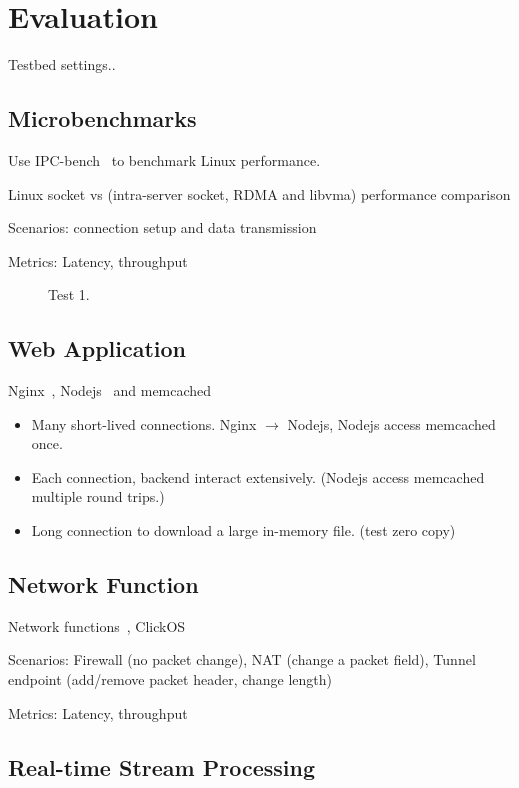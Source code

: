 \section{Evaluation}
\label{sec:evaluation}

Testbed settings..

\subsection{Microbenchmarks}

Use IPC-bench~\cite{ipc-bench} to benchmark Linux performance.

Linux socket vs \sys (intra-server socket, RDMA and libvma) performance comparison

Scenarios: connection setup and data transmission

Metrics: Latency, throughput
\begin{figure}[t]
	\centering
	
	\caption{Test 1.}
	\label{fig:eval-messagesize}
\end{figure}
\subsection{Web Application}

Nginx~\cite{nginx}, Nodejs~\cite{nodejs} and memcached~\cite{memcached}

\begin{itemize}
	\item Many short-lived connections. Nginx $\rightarrow$ Nodejs, Nodejs access memcached once.
	\item Each connection, backend interact extensively. (Nodejs access memcached multiple round trips.)
	\item Long connection to download a large in-memory file. (test zero copy)
\end{itemize}

\subsection{Network Function}

Network functions~\cite{li2016clicknp}, ClickOS~\cite{martins2014clickos}

Scenarios: Firewall (no packet change), NAT (change a packet field), Tunnel endpoint (add/remove packet header, change length)

Metrics: Latency, throughput

\subsection{Real-time Stream Processing}

